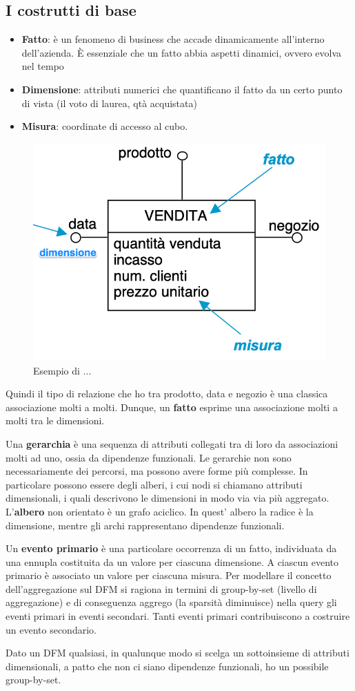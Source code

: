 \subsection{I costrutti di base}
\begin{itemize}
	\item
	\textbf{Fatto}: è un fenomeno di business che accade dinamicamente all’interno dell’azienda. È essenziale che un fatto abbia aspetti dinamici, ovvero evolva nel tempo
	\item 
	\textbf{Dimensione}: attributi numerici che quantificano il fatto da un certo punto di vista (il voto di laurea, qtà acquistata)
	\item 
	\textbf{Misura}: coordinate di accesso al cubo. 
\end{itemize}
\begin{figure}[H]
	\centering
	\includegraphics[width=0.7\linewidth]{img/example_fatto}
	\caption{Esempio di ...}
	\label{fig:exfatto}
\end{figure}
Quindi il tipo di relazione che ho tra prodotto, data e negozio è una classica associazione molti a molti. Dunque, un \textbf{fatto} esprime una associazione molti a molti tra le dimensioni.

Una \textbf{gerarchia} è una sequenza di attributi collegati tra di loro da associazioni molti ad uno, ossia da dipendenze funzionali. Le gerarchie non sono necessariamente dei percorsi, ma possono avere forme più complesse. In particolare possono essere degli alberi, i cui nodi si chiamano attributi dimensionali, i quali descrivono le dimensioni in modo via via più aggregato. L’\textbf{albero} non orientato è un grafo aciclico. In quest' albero la radice è la dimensione, mentre gli archi rappresentano dipendenze funzionali. 

Un \textbf{evento primario} è una particolare occorrenza di un fatto, individuata da una ennupla costituita da un valore per ciascuna dimensione. A ciascun evento primario è associato un valore per ciascuna misura. Per modellare il concetto dell’aggregazione sul DFM si ragiona in termini di group-by-set (livello di aggregazione) e di conseguenza aggrego (la sparsità diminuisce) nella query gli eventi primari in eventi secondari. Tanti eventi primari contribuiscono a costruire un evento secondario.  

Dato un DFM qualsiasi, in qualunque modo si scelga un sottoinsieme di attributi dimensionali, a patto che non ci siano dipendenze funzionali, ho un possibile group-by-set. 
